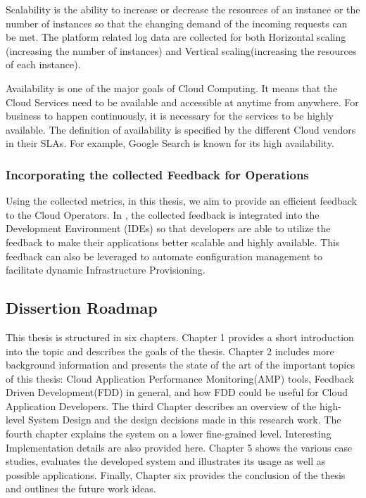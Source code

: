 \documentclass[article,type=msc,colorback,12pt,accentcolor=tud7b,table]{tudthesis}
\begin{document}
	\par Scalability is the ability to increase or decrease the resources of an instance or the number of instances so that the changing demand of the incoming requests can be met. The platform related log data are collected for both Horizontal scaling (increasing the number of instances) and Vertical scaling(increasing the resources of each instance).
	
	\par Availability is one of the major goals of Cloud Computing. It means that the Cloud Services need to be available and accessible at anytime from anywhere. For business to happen continuously, it is necessary for the services to be highly available. The definition of availability is specified by the different Cloud vendors in their SLAs. For example, Google Search is known for its high availability.	
	
	\subsubsection{Incorporating the collected Feedback for Operations}	
	
	Using the collected metrics, in this thesis, we aim to provide an efficient feedback to the Cloud Operators. In \cite{cito2015runtime}, the collected feedback is integrated into the Development Environment (IDEs) so that developers are able to utilize the feedback to make their applications better scalable and highly available. This feedback can also be leveraged to automate configuration management to facilitate dynamic Infrastructure Provisioning.
	
	\subsection{Dissertion Roadmap}

	\par This thesis is structured in six chapters. Chapter 1 provides a short introduction into the topic and describes the goals of the thesis. Chapter 2 includes more background information and presents the state of the art of the important topics of this thesis: Cloud Application Performance Monitoring(AMP) tools, Feedback Driven Development(FDD) in general, and how FDD could be useful for Cloud Application Developers. The third Chapter describes an overview of the high-level System Design and the design decisions made in this research work. The fourth chapter explains the system on a lower fine-grained level. Interesting Implementation details are also provided here. Chapter 5 shows the various case studies, evaluates the developed system and illustrates its usage as well as possible applications. Finally, Chapter six provides the conclusion of the thesis and outlines the future work ideas.
\end{document}
